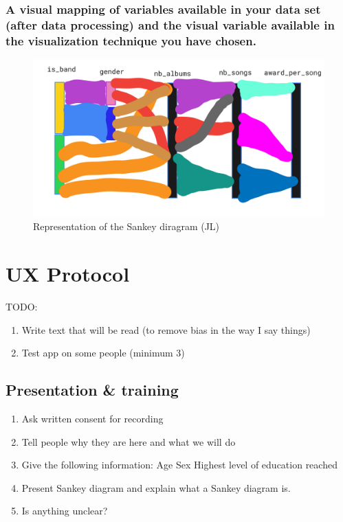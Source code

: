 \documentclass{article}
\begin{document}
\subsubsection*{A visual mapping of variables available in your data set (after data processing) and the visual variable available in the visualization technique you have chosen.}

\begin{figure}[H]
    \centering
    \includegraphics[width=.8\textwidth]{Images/sketch_jl.png}
    \caption{Representation of the Sankey diragram (JL)}
\end{figure}

\section{UX Protocol}
TODO:
\begin{enumerate}
    \item Write text that will be read (to remove bias in the way I say things)
    \item Test app on some people (minimum 3)
\end{enumerate}

\subsection{Presentation \& training}
\begin{enumerate}
    \item Ask written consent for recording
    \item Tell people why they are here and what we will do
    \item Give the following information:
          \subitem Age
          \subitem Sex
          \subitem Highest level of education reached
    \item Present Sankey diagram and explain what a Sankey diagram is.
    \item Is anything unclear?
\end{enumerate}
\end{document}
